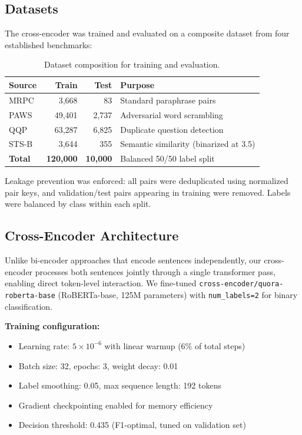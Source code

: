 \documentclass[pdflatex,sn-basic]{sn-jnl}
\begin{document}
\subsection{Datasets}

The cross-encoder was trained and evaluated on a composite dataset from four established benchmarks:

\begin{table}[h]
\centering
\caption{Dataset composition for training and evaluation.}
\label{tab:datasets}
\begin{tabular}{lrrl}
\toprule
\textbf{Source} & \textbf{Train} & \textbf{Test} & \textbf{Purpose} \\
\midrule
MRPC~\cite{dolan2005msrp} & 3,668 & 83 & Standard paraphrase pairs \\
PAWS~\cite{zhang2019paws} & 49,401 & 2,737 & Adversarial word scrambling \\
QQP~\cite{wang2018glue} & 63,287 & 6,825 & Duplicate question detection \\
STS-B~\cite{wang2018glue} & 3,644 & 355 & Semantic similarity (binarized at 3.5) \\
\midrule
\textbf{Total} & \textbf{120,000} & \textbf{10,000} & Balanced 50/50 label split \\
\bottomrule
\end{tabular}
\end{table}

Leakage prevention was enforced: all pairs were deduplicated using normalized pair keys, and validation/test pairs appearing in training were removed. Labels were balanced by class within each split.

\subsection{Cross-Encoder Architecture}

Unlike bi-encoder approaches that encode sentences independently, our cross-encoder processes both sentences jointly through a single transformer pass, enabling direct token-level interaction. We fine-tuned \texttt{cross-encoder/quora-roberta-base} (RoBERTa-base, 125M parameters) with \texttt{num\_labels=2} for binary classification.

\textbf{Training configuration:}
\begin{itemize}
    \item Learning rate: $5 \times 10^{-6}$ with linear warmup (6\% of total steps)
    \item Batch size: 32, epochs: 3, weight decay: 0.01
    \item Label smoothing: 0.05, max sequence length: 192 tokens
    \item Gradient checkpointing enabled for memory efficiency
    \item Decision threshold: 0.435 (F1-optimal, tuned on validation set)
\end{itemize}
\end{document}
